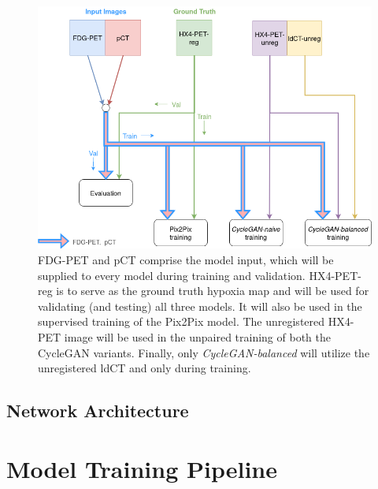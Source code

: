 
\begin{figure}[h!]
    \centering
    \includegraphics[width=0.95\linewidth]{figures/Data/which_images_where.png}
    \caption{FDG-PET and pCT comprise the model input, which will be supplied to every model during training and validation. HX4-PET-reg is to serve as the ground truth hypoxia map and will be used for validating (and testing) all three models. It will also be used in the supervised training of the Pix2Pix model. The unregistered HX4-PET image will be used in the unpaired training of both the CycleGAN variants. Finally, only \textit{CycleGAN-balanced} will utilize the unregistered ldCT and only during training.}
    \label{fig:which_images_where}
\end{figure}


\subsection{Network Architecture}
\label{network_architectures}



\section{Model Training Pipeline}



